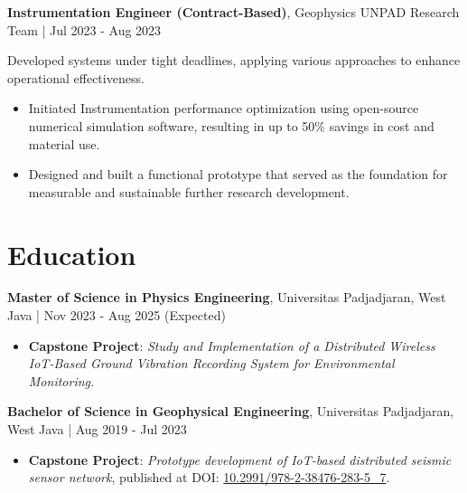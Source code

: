 \documentclass[10pt,a4paper]{article}
\begin{document}
\setlength{\fboxsep}{0pt}
\colorbox[HTML]{E6F8DC}{%
  \parbox{\linewidth}{%
    \textbf{Instrumentation Engineer (Contract-Based)}, Geophysics UNPAD Research Team \quad | \quad Jul 2023 - Aug 2023
  }%
}

Developed systems under tight deadlines, applying various approaches to enhance operational effectiveness.

\begin{itemize}[left=1.5em, noitemsep, topsep=0pt]
  \item Initiated Instrumentation performance optimization using open-source numerical simulation software, resulting in up to 50\% savings in cost and material use.
  \item Designed and built a functional prototype that served as the foundation for measurable and sustainable further research development.
\end{itemize}

\section*{Education}


  \setlength{\fboxsep}{0pt}%
  \colorbox[HTML]{E6F8DC}{%
    \parbox{\linewidth}{%
      \textbf{Master of Science in Physics Engineering}, Universitas Padjadjaran, West Java \quad | \quad Nov 2023 - Aug 2025 (Expected)%
    }%
  }
  \begin{itemize}[left=1.5em, noitemsep, topsep=0pt]
      \item \textbf{Capstone Project}: \textit{Study and Implementation of a Distributed Wireless IoT-Based Ground Vibration Recording System for Environmental Monitoring.}
  \end{itemize}

  \vspace{0.5em}

  \setlength{\fboxsep}{0pt}%
  \colorbox[HTML]{E6F8DC}{%
    \parbox{\linewidth}{%
      \textbf{Bachelor of Science in Geophysical Engineering}, Universitas Padjadjaran, West Java \quad | \quad Aug 2019 - Jul 2023%
    }%
  }
  \begin{itemize}[left=1.5em, noitemsep, topsep=0pt]
    \item \textbf{Capstone Project}: \textit{Prototype development of IoT-based distributed seismic sensor network}, published at \linebreak DOI: \href{https://doi.org/10.2991/978-2-38476-283-5_7}{10.2991/978-2-38476-283-5\_7}.
  \end{itemize}
\end{document}
